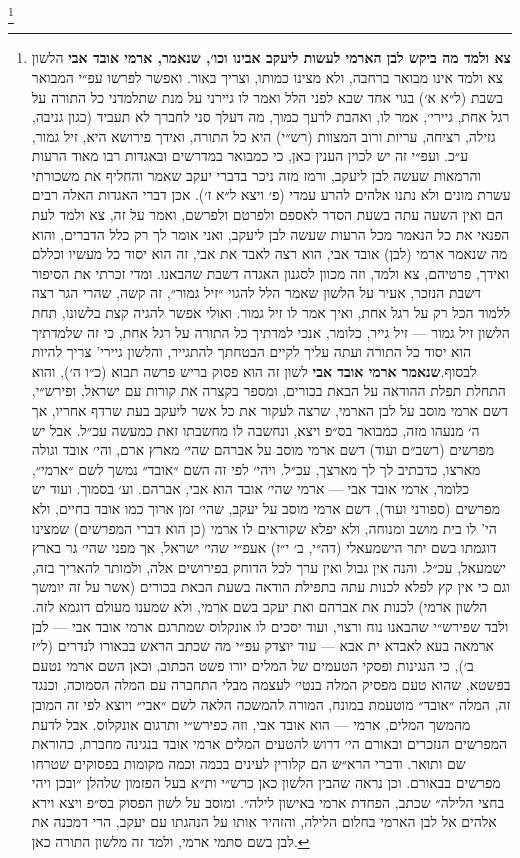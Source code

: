 \documentclass[12pt, openany]{book}
\newcommand{\footnotecomment}[1]{
	\renewcommand\thefootnote{}
	\footnote{\textsf{#1}}}
\newcommand{\commenta}[1]{\footnotecomment{#1}\hspace{0em}}
\begin{document}
\commenta{\textrm{\textbf{צא ולמד מה ביקש לבן הארמי לעשות ליעקב אבינו וכו׳, שנאמר, ארמי אובד אבי}} הלשון צא ולמד אינו מבואר ברחבה, ולא מצינו כמותו, וצריך באור. ואפשר לפרשו עפ״י המבואר בשבת (ל״א א׳) בגוי אחד שבא לפני הלל ואמר לו גיירני על מנת שתלמדני כל התורה על רגל אחת, גיירי׳, אמר לו, ואהבת לרעך כמוך, מה דעלך סני לחברך לא תעביד (כגון גניבה, גזילה, רציחה, עריות ורוב המצוות (רש״י) היא כל התורה, ואידך פירושא היא, זיל גמור, ע״כ. ועפ״י זה יש לכוין הענין כאן, כי כמבואר במדרשים ובאגדות רבו מאוד הרעות והרמאות שעשה לבן ליעקב, ורמז מזה ניכר בדברי יעקב שאמר והחליף את משכורתי עשרת מונים ולא נתנו אלהים להרע עמדי (פ׳ ויצא ל״א ז׳). אכן דברי האגדות האלה רבים הם ואין השעה עתה בשעת הסדר לאספם ולפרטם ולפרשם, ואמר על זה, צא ולמד לעת הפנאי את כל הנאמר מכל הרעות שעשה לבן ליעקב, ואני אומר לך רק כלל הדברים, והוא מה שנאמר ארמי (לבן) אובד אבי, הוא רצה לאבד את אבי, זה הוא יסוד כל מעשיו וכללם ואידך, פרטיהם, צא ולמד, וזה מכוון לסגנון האגדה דשבת שהבאנו. ומדי זכרתי את הסיפור דשבת הנזכר, אעיר על הלשון שאמר הלל להגוי ״זיל גמור״, זה קשה, שהרי הגר רצה ללמוד הכל רק על רגל אחת, ואיך אמר לו זיל גמור. ואולי אפשר להגיה קצת בלשונו, תחת הלשון זיל גמור — זיל גייר, כלומר, אנכי למדתיך כל התורה על רגל אחת, כי זה שלמדתיך הוא יסוד כל התורה ועתה עליך לקיים הבטחתך להתגייר, והלשון גיירי' צריך להיות לבסוף.\textrm{\textbf{שנאמר ארמי אובד אבי}} לשון זה הוא פסוק בריש פרשה תבוא (כ״ו ה׳), והוא התחלת תפלת ההודאה על הבאת בכורים, ומספר בקצרה את קורות עם ישראל, ופירש״י, דשם ארמי מוסב על לבן הארמי, שרצה לעקור את כל אשר ליעקב בעת שרדף אחריו, אך ה׳ מנעהו מזה, כמבואר בס״פ ויצא, ונחשבה לו מחשבתו זאת כמעשה עכ״ל. אבל יש מפרשים (רשב״ם ועוד) דשם ארמי מוסב על אברהם שהי׳ מארץ ארם, והי׳ אובד וגולה מארצו, כדכתיב לך לך מארצך, עכ״ל. ויהי׳ לפי זה השם ״אובד״ נמשך לשם ״ארמי״, כלומר, ארמי אובד אבי — ארמי שהי׳ אובד הוא אבי, אברהם. וע׳ בסמוך. ועוד יש מפרשים (ספורני ועוד), דשם ארמי מוסב על יעקב, שהי׳ זמן ארוך כמו אובד בחיים, ולא הי' לו בית מושב ומנוחה, ולא יפלא שקוראים לו ארמי (כן הוא דברי המפרשים) שמצינו דוגמתו בשם יתר הישמעאלי (דה״י, ב׳ י״ז) אעפ״י שהי׳ ישראל, אך מפני שהי׳ גר בארץ ישמעאל, עכ״ל. והנה אין גבול ואין ערך לכל הדוחק בפירושים אלה, ולמותר להאריך בזה, וגם כי אין קץ לפלא לכנות עתה בתפילת הודאה בשעת הבאת בכורים (אשר על זה יומשך הלשון ארמי) לכנות את אברהם ואת יעקב בשם ארמי, ולא שמענו מעולם דוגמא לזה. ולבד שפירש״י שהבאנו נוח ורצוי, ועוד יסכים לו אונקלוס שמתרגם ארמי אובד אבי — לבן ארמאה בעא לאבדא ית אבא — עוד יוצדק עפ״י מה שכתב הראש בבאורו לנדרים (ל״ז ב׳), כי הנגינות ופסקי הטעמים של המלים יורו פשט הכתוב, וכאן השם ארמי נטעם בפשטא, שהוא טעם מפסיק המלה בנטי׳ לעצמה מבלי התחברה עם המלה הסמוכה, וכנגד זה, המלה ״אובד״ מוטעמת במונח, המורה להמשכה הלאה לשם ״אבי״ ויוצא לפי זה המובן מהמשך המלים, ארמי — הוא אובד אבי, וזה כפירש״י ותרגום אונקלוס. אבל לדעת המפרשים הנזכרים ובאורם הי׳ דרוש להטעים המלים ארמי אובד בנגינה מחברת, כהוראת שם ותואר. ודברי הרא״ש הם קלורין לעינים בכמה וכמה מקומות בפסוקים שטרחו מפרשים בבאורם. וכן נראה שהבין הלשון כאן כרש״י ות״א בעל הפזמון שלהלן ״ובכן ויהי בחצי הלילה״ שכתב, הפחדת ארמי באישון לילה״. ומוסב על לשון הפסוק בס״פ ויצא וירא אלהים אל לבן הארמי בחלום הלילה, והזהיר אותו על הנהגתו עם יעקב, הרי דמכנה את לבן בשם סתמי ארמי, ולמד זה מלשון התורה כאן.}%
\end{document}
